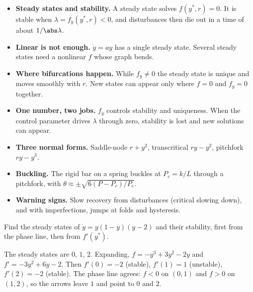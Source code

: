 \begin{gbox*}
\begin{itemize}
  \item \textbf{Steady states and stability.} A steady state solves $f(y^*,r) = 0$.
        It is stable when $\lambda = f_y(y^*,r) < 0$, and disturbances then die out
        in a time of about $1/\abs\lambda$.
  \item \textbf{Linear is not enough.} $\dot y = ay$ has a single steady state.
        Several steady states need a nonlinear $f$ whose graph bends.
  \item \textbf{Where bifurcations happen.} While $f_y \neq 0$ the steady state is
        unique and moves smoothly with $r$. New states can appear only where
        $f = 0$ and $f_y = 0$ together.
  \item \textbf{One number, two jobs.} $f_y$ controls stability and uniqueness.
        When the control parameter drives $\lambda$ through zero, stability is lost
        and new solutions can appear.
  \item \textbf{Three normal forms.} Saddle-node $r + y^2$, transcritical $ry - y^2$,
        pitchfork $ry - y^3$.
  \item \textbf{Buckling.} The rigid bar on a spring buckles at $P_c = k/L$ through
        a pitchfork, with $\theta \approx \pm\sqrt{6(P - P_c)/P_c}$.
  \item \textbf{Warning signs.} Slow recovery from disturbances (critical slowing
        down), and with imperfections, jumps at folds and hysteresis.
\end{itemize}
\end{gbox*}

\label{sec:st-exo}


\label{exo:st-three}
%
Find the steady states of $\dot y = y(1-y)(y-2)$ and their stability, first from
the phase line, then from $f'(y^*)$.
\begin{solution}
The steady states are $0$, $1$, $2$. Expanding, $f = -y^3 + 3y^2 - 2y$ and
$f' = -3y^2 + 6y - 2$. Then $f'(0) = -2$ (stable), $f'(1) = 1$ (unstable),
$f'(2) = -2$ (stable). The phase line agrees: $f < 0$ on $(0,1)$ and $f > 0$ on
$(1,2)$, so the arrows leave $1$ and point to $0$ and $2$.
\end{solution}

